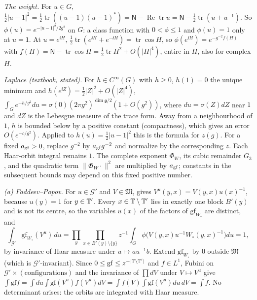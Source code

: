 \begin{detail}\label{d7:gf}
\begin{step}
\emph{The weight.} For $u\in G$, $\frac12|u-1|^2=\frac12\operatorname{tr}((u-1)(u-1)^*)=\mathsf N-\operatorname{Re}\operatorname{tr}u=\mathsf N-\frac12\operatorname{tr}(u+u^{-1})$. So $\phi(u)=e^{-|u-1|^2/2g^2}$ on $G$: a class function with $0<\phi\le1$ and $\phi(u)=1$ only at $u=1$. At $u=e^{\ii H}$, $\frac12\operatorname{tr}(e^{\ii H}+e^{-\ii H})=\operatorname{tr}\cos H$, so $\phi(e^{\ii H})=e^{-g^{-2}f(H)}$ with $f(H)=\mathsf N-\operatorname{tr}\cos H=\frac12\operatorname{tr}H^2+O(|H|^4)$, entire in $H$, also for complex $H$.
\end{step}
\begin{step}
\emph{Laplace (textbook, stated).} For $h\in C^\infty(G)$ with $h\ge0$, $h(1)=0$ the unique minimum and $h(e^{\ii Z})=\frac12|Z|^2+O(|Z|^4)$, $\int_Ge^{-h/g^2}du=\sigma(0)(2\pi g^2)^{\dim\mathfrak g/2}(1+O(g^2))$, where $du=\sigma(Z)dZ$ near $1$ and $dZ$ is the Lebesgue measure of the trace form. Away from a neighbourhood of $1$, $h$ is bounded below by a positive constant (compactness), which gives an error $O(e^{-c/g^2})$. Applied to $h(u)=\frac12|u-1|^2$ this is the formula for $z(g)$. For a fixed $a_{\rm gf}>0$, replace $g^{-2}$ by $a_{\rm gf}g^{-2}$ and normalize by the corresponding $z$. Each Haar-orbit integral remains $1$. The complete exponent $\Phi_W$, its cubic remainder $G_3$, and the quadratic term $\|\mathfrak G_W\cdot\|^2$ are multiplied by $a_{\rm gf}$; constants in the subsequent bounds may depend on this fixed positive number.
\end{step}
\begin{step}
\emph{(a) Faddeev--Popov.} For $u\in\mathcal G'$ and $V\in\mathfrak M$,  gives $V^u(y,x)=V(y,x)u(x)^{-1}$, because $u(y)=1$ for $y\in\mathbb T'$. Every $x\in\mathbb T\setminus\mathbb T'$ lies in exactly one block $B'(y)$ and is not its centre, so the variables $u(x)$ of the factors of $\mathrm{gf}_{W_\circ}$ are distinct, and
\[
\int_{\mathcal G'}\mathrm{gf}_{W_\circ}(V^u)\,du=\prod_{y}\prod_{x\in B'(y)\setminus\{y\}}z^{-1}\int_G\phi\big(V(y,x)u^{-1}W_\circ(y,x)^{-1}\big)du=1,
\]
by invariance of Haar measure under $u\mapsto au^{-1}b$. Extend $\mathrm{gf}_{W_\circ}$ by $0$ outside $\mathfrak M$ (which is $\mathcal G'$-invariant). Since $0\le\mathrm{gf}\le z^{-|\mathbb T\setminus\mathbb T'|}$ and $f\in L^1$, Fubini on $\mathcal G'\times(\text{configurations})$ and the invariance of $\prod dV$ under $V\mapsto V^u$ give $\int\mathrm{gf}f=\int du\int\mathrm{gf}(V^u)f(V^u)dV=\int f(V)\int\mathrm{gf}(V^u)du\,dV=\int f$. No determinant arises: the orbits are integrated with Haar measure.

\end{step}
\end{detail}
